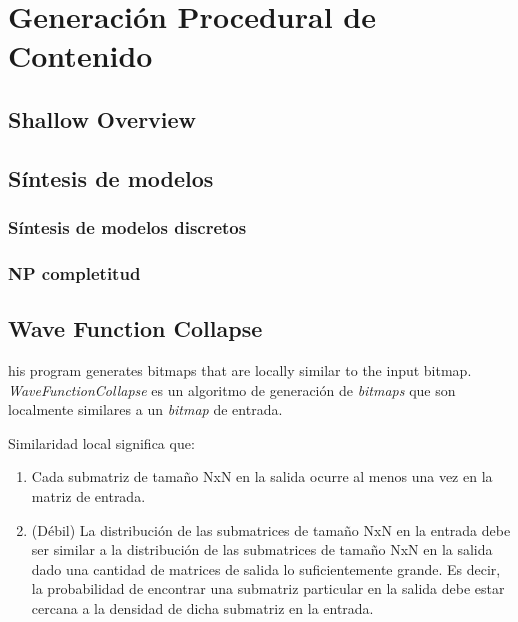 \chapter{Generación Procedural de Contenido}\label{chapter:background}

\section{Shallow Overview}
\section{Síntesis de modelos}
\subsection{Síntesis de modelos discretos}

\subsection{NP completitud}

\section{Wave Function Collapse}
his program generates bitmaps that are locally similar to the input bitmap.
\textit{WaveFunctionCollapse} es un algoritmo de generación de \textit{bitmaps}
que son localmente similares a un \textit{bitmap} de entrada.

Similaridad local significa que: 
\begin{enumerate}
    \item Cada submatriz de tamaño NxN en la salida ocurre al menos una vez
        en la matriz de entrada.
    \item (Débil) La distribución de las submatrices de tamaño NxN en la entrada debe ser
        similar a la distribución de las submatrices de tamaño NxN en la salida dado
        una cantidad de matrices de salida lo suficientemente grande. Es decir, la probabilidad
        de encontrar una submatriz particular en la salida debe estar cercana a la densidad
        de dicha submatriz en la entrada. 
\end{enumerate}


